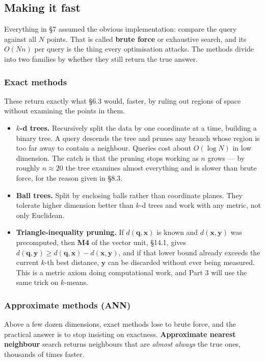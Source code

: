 \documentclass[11pt]{article}
\theoremstyle{plain}
\theoremstyle{definition}
\theoremstyle{remark}
\newcommand{\vc}[1]{\mathbf{#1}}
\begin{document}
\subsection{Making it fast}
Everything in \S7 assumed the obvious implementation: compare the query against
all $N$ points. That is called \textbf{brute force} or exhaustive search, and
its $O(Nn)$ per query is the thing every optimisation attacks. The methods
divide into two families by whether they still return the true answer.

\subsubsection*{Exact methods}
These return exactly what \S6.3 would, faster, by ruling out regions of space
without examining the points in them.

\begin{itemize}[leftmargin=1.4em,itemsep=4pt]
  \item \textbf{$k$-d trees.} Recursively split the data by one coordinate at a
        time, building a binary tree. A query descends the tree and prunes any
        branch whose region is too far away to contain a neighbour. Queries cost
        about $O(\log N)$ in low dimension. The catch is that the pruning stops
        working as $n$ grows --- by roughly $n\approx20$ the tree examines
        almost everything and is slower than brute force, for the reason given
        in \S8.3.
  \item \textbf{Ball trees.} Split by enclosing balls rather than coordinate
        planes. They tolerate higher dimension better than $k$-d trees and work
        with any metric, not only Euclidean.
  \item \textbf{Triangle-inequality pruning.} If $d(\vc{q},\vc{x})$ is known and
        $d(\vc{x},\vc{y})$ was precomputed, then \textbf{M4} of the vector unit,
        \S14.1, gives $d(\vc{q},\vc{y}) \ge d(\vc{q},\vc{x}) - d(\vc{x},\vc{y})$,
        and if that lower bound already exceeds the current $k$-th best
        distance, $\vc{y}$ can be discarded without ever being measured. This is
        a metric axiom doing computational work, and Part 3 will use the same
        trick on $k$-means.
\end{itemize}

\subsubsection*{Approximate methods (ANN)}
Above a few dozen dimensions, exact methods lose to brute force, and the
practical answer is to stop insisting on exactness. \textbf{Approximate nearest
neighbour} search returns neighbours that are \emph{almost always} the true
ones, thousands of times faster.
\end{document}
